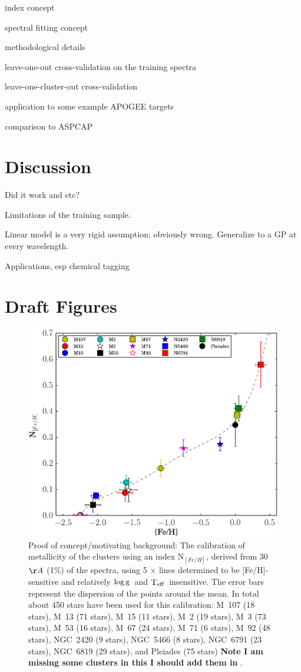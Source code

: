 \documentclass[12pt, preprint]{aastex}
\newcommand{\teff}{\mbox{$\rm T_{eff}$}}
\newcommand{\logg}{\mbox{$\rm \log g$}}
\begin{document}
index concept

spectral fitting concept

methodological details

leave-one-out cross-validation on the training spectra

leave-one-cluster-out cross-validation

application to some example APOGEE targets

comparison to ASPCAP

\section{Discussion}

Did it work and etc?

Limitations of the training sample.

Linear model is a very rigid assumption; obviously wrong.
Generalize to a GP at every wavelength.

Applications, esp chemical tagging

\section{Draft Figures}


\begin{figure}[h!]
  \includegraphics[width=\hsize]{./plots/metals_index.eps}
\caption{Proof of concept/motivating background: The calibration of metallicity of the clusters using an index N$_{[Fe/H]}$, derived from 30 $\AA$ (1\%) of the spectra, using 5 $\times$ lines determined to be [Fe/H]-sensitive and relatively \logg\ and \teff\ insensitive. The error bars represent the dispersion of the points
  around the mean. In total about 450  stars have been used for this
  calibration: M~107 (18 stars), M~13 (71 stars), M~15 (11 stars), M~2
  (19 stars), M~3 (73 stars), M~53 (16 stars), M~67 (24 stars), M~71
  (6 stars), M~92 (48 stars), NGC~2420 (9 stars), NGC~5466 (8 stars),
  NGC~6791 (23 stars), NGC~6819 (29 stars), and Pleiades (75 stars)  \textbf{Note I am missing some clusters in this I should add them in} .}
\label{fig:index}
\end{figure}
\end{document}
